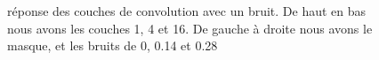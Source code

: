 \documentclass[12pt]{article}
\begin{document}
\begin{figure}[htb]
  \hfill
  \hfill
  \hfill
  \caption{réponse des couches de convolution avec un bruit. De haut en bas nous avons les couches 1, 4 et 16. De gauche à droite nous avons le masque, et les bruits de 0, 0.14 et 0.28}\label{fig:occlus_dynamic}
\end{figure}
\end{document}
